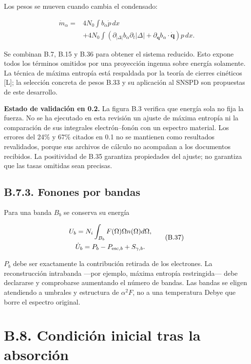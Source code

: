 \documentclass[
  spanish,
  10pt,
  a4paper,
]{article}
\newcounter{none} %
\begin{document}
Los pesos se mueven cuando cambia el condensado:

\[
\begin{aligned}
\dot m_\alpha={}&4N_0\int b_\alpha\dot p\,dx\\
&+4N_0\int(\partial_{|\Delta|}b_\alpha\partial_t|\Delta|+
\partial_{\mathbf q}b_\alpha\cdot\dot{\mathbf q})p\,dx.
\end{aligned}\tag{B.36}
\]

Se combinan B.7, B.15 y B.36 para obtener el sistema reducido. Esto
expone todos los términos omitidos por una proyección ingenua sobre
energía solamente. La técnica de máxima entropía está respaldada por la
teoría de cierres cinéticos {[}L{]}; la selección concreta de pesos B.33
y su aplicación al SNSPD son propuestas de este desarrollo.

\textbf{Estado de validación en 0.2.} La figura B.3 verifica que energía
sola no fija la fuerza. No se ha ejecutado en esta revisión un ajuste de
máxima entropía ni la comparación de sus integrales electrón--fonón con
un espectro material. Los errores del 24\% y 67\% citados en 0.1 no se
mantienen como resultados revalidados, porque sus archivos de cálculo no
acompañan a los documentos recibidos. La positividad de B.35 garantiza
propiedades del ajuste; no garantiza que las tasas omitidas sean
precisas.

\subsection{B.7.3. Fonones por bandas}\label{b.7.3.-fonones-por-bandas}

Para una banda \(B_b\) se conserva su energía

\[
\begin{gathered}
U_b=N_i\int_{B_b}F(\Omega)\Omega n(\Omega)d\Omega,\\
\dot U_b=P_b-P_{{\rm esc},b}+S_{\gamma,b}.
\end{gathered} \tag{B.37}
\]

\(P_b\) debe ser exactamente la contribución retirada de los electrones.
La reconstrucción intrabanda ---por ejemplo, máxima entropía
restringida--- debe declararse y comprobarse aumentando el número de
bandas. Las bandas se eligen atendiendo a umbrales y estructura de
\(\alpha^2F\), no a una temperatura Debye que borre el espectro
original.

\section{B.8. Condición inicial tras la
absorción}\label{b.8.-condiciuxf3n-inicial-tras-la-absorciuxf3n}
\end{document}

